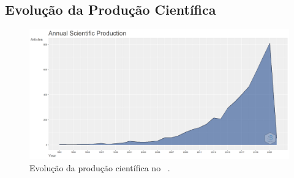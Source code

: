 \subsection{Evolução da Produção Científica}

\begin{figure}
    \centering
    \includegraphics[width=1\textwidth]{experiments/vinis-caixe/PesqBibliogr/MineracaoDados/WoS-20220204/Dataset/AnnualScientificProduction-2022-02-06.png}
    \caption{Evolução da produção científica no \dataset\ .}
    \label{fig:evol:anual:vinis-caixe}
\end{figure}